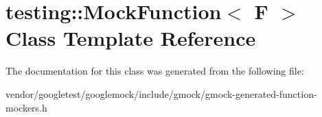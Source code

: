 \hypertarget{classtesting_1_1_mock_function}{}\section{testing\+:\+:Mock\+Function$<$ F $>$ Class Template Reference}
\label{classtesting_1_1_mock_function}


The documentation for this class was generated from the following file\+:\begin{DoxyCompactItemize}
\item 
vendor/googletest/googlemock/include/gmock/gmock-\/generated-\/function-\/mockers.\+h\end{DoxyCompactItemize}
